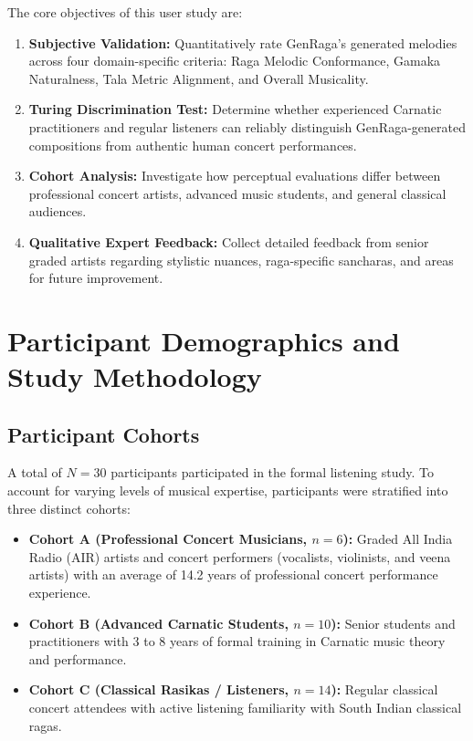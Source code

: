 \documentclass[11pt,a4paper]{article}
\begin{document}
The core objectives of this user study are:
\begin{enumerate}
    \item \textbf{Subjective Validation:} Quantitatively rate GenRaga's generated melodies across four domain-specific criteria: Raga Melodic Conformance, Gamaka Naturalness, Tala Metric Alignment, and Overall Musicality.
    \item \textbf{Turing Discrimination Test:} Determine whether experienced Carnatic practitioners and regular listeners can reliably distinguish GenRaga-generated compositions from authentic human concert performances.
    \item \textbf{Cohort Analysis:} Investigate how perceptual evaluations differ between professional concert artists, advanced music students, and general classical audiences.
    \item \textbf{Qualitative Expert Feedback:} Collect detailed feedback from senior graded artists regarding stylistic nuances, raga-specific sancharas, and areas for future improvement.
\end{enumerate}

\section{Participant Demographics and Study Methodology}

\subsection{Participant Cohorts}
A total of $N=30$ participants participated in the formal listening study. To account for varying levels of musical expertise, participants were stratified into three distinct cohorts:
\begin{itemize}
    \item \textbf{Cohort A (Professional Concert Musicians, $n=6$):} Graded All India Radio (AIR) artists and concert performers (vocalists, violinists, and veena artists) with an average of 14.2 years of professional concert performance experience.
    \item \textbf{Cohort B (Advanced Carnatic Students, $n=10$):} Senior students and practitioners with 3 to 8 years of formal training in Carnatic music theory and performance.
    \item \textbf{Cohort C (Classical Rasikas / Listeners, $n=14$):} Regular classical concert attendees with active listening familiarity with South Indian classical ragas.
\end{itemize}
\end{document}
